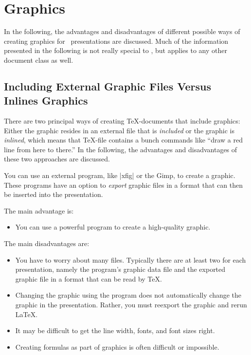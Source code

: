 %
%
%


\section{Graphics}

\label{section-graphics}

In the following, the advantages and disadvantages of different
possible ways of creating graphics for \beamer\ presentations are
discussed. Much of the information presented in the following is not
really special to \beamer, but applies to any other document class as well.


\subsection{Including External Graphic Files Versus Inlines Graphics}

There are two principal ways of creating \TeX-documents that include
graphics: Either the graphic resides in an external file that is
\emph{included} or the graphic is \emph{inlined}, which means that
\TeX-file contains a bunch commands like ``draw a red line from
here to there.'' In the following, the advantages and disadvantages of
these two approaches are discussed.

You can use an external program, like |xfig| or the Gimp, to create a
graphic. These programs have an option to \emph{export} graphic files
in a format that can then be inserted into the presentation.

The main advantage is:
\begin{itemize}
\item
  You can use a powerful program to create a high-quality graphic.
\end{itemize}

The main disadvantages are:
\begin{itemize}
\item
  You  have to worry about many files. Typically there are at least
  two for each presentation, namely the program's graphic data file and the
  exported graphic file in a format that can be read by \TeX.
\item
  Changing the graphic using the program does not automatically change
  the graphic in the presentation. Rather, you must reexport the
  graphic and rerun \LaTeX.
\item
  It may be difficult to get the line width, fonts, and font sizes
  right.
\item
  Creating formulas as part of graphics is often difficult or
  impossible.
\end{itemize}

